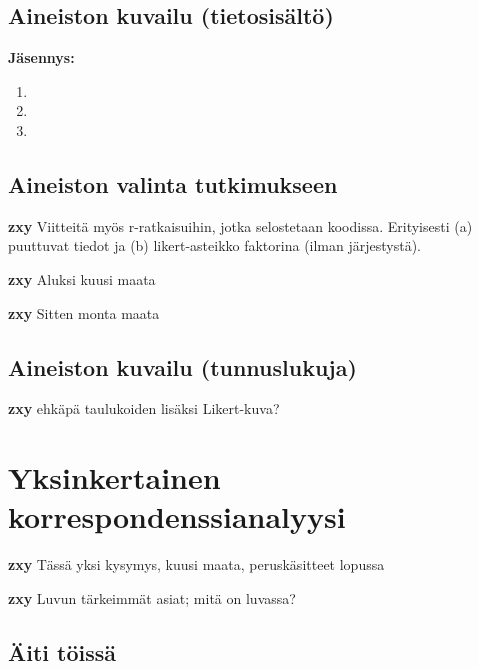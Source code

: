 \documentclass[finnish,]{book}
\begin{document}
\hypertarget{aineiston-kuvailu-tietosisalto}{%
\section{Aineiston kuvailu
(tietosisältö)}\label{aineiston-kuvailu-tietosisalto}}

\textbf{Jäsennys:}

\begin{enumerate}
\def\labelenumi{\arabic{enumi}.}
\item
\item
\item
\end{enumerate}

\hypertarget{aineiston-valinta-tutkimukseen}{%
\section{Aineiston valinta
tutkimukseen}\label{aineiston-valinta-tutkimukseen}}

\textbf{zxy} Viitteitä myös r-ratkaisuihin, jotka selostetaan koodissa.
Erityisesti (a) puuttuvat tiedot ja (b) likert-asteikko faktorina (ilman
järjestystä).

\textbf{zxy} Aluksi kuusi maata

\textbf{zxy} Sitten monta maata

\hypertarget{aineiston-kuvailu-tunnuslukuja}{%
\section{Aineiston kuvailu
(tunnuslukuja)}\label{aineiston-kuvailu-tunnuslukuja}}

\textbf{zxy} ehkäpä taulukoiden lisäksi Likert-kuva?

\hypertarget{yksinkertainen-korrespondenssianalyysi}{%
\chapter{Yksinkertainen
korrespondenssianalyysi}\label{yksinkertainen-korrespondenssianalyysi}}

\textbf{zxy} Tässä yksi kysymys, kuusi maata, peruskäsitteet lopussa

\textbf{zxy} Luvun tärkeimmät asiat; mitä on luvassa?

\hypertarget{aiti-toissa}{%
\section{Äiti töissä}\label{aiti-toissa}}
\end{document}
